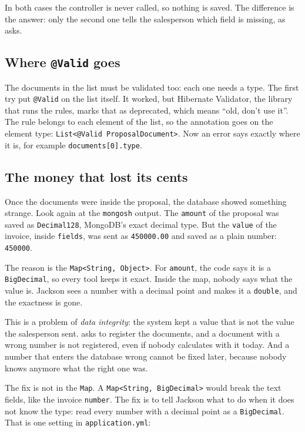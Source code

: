 In both cases the controller is never called, so nothing is saved. The
difference is the answer: only the second one tells the salesperson which
field is missing, as  asks.

\subsection*{Where \texttt{@Valid} goes}

The documents in the list must be validated too: each one needs a type. The
first try put \texttt{@Valid} on the list itself. It worked, but Hibernate
Validator, the library that runs the rules, marks that as deprecated, which
means ``old, don't use it''. The rule belongs to each element of the list, so
the annotation goes on the element type: \texttt{List<@Valid
ProposalDocument>}. Now an error says exactly where it is, for example
\texttt{documents[0].type}.

\subsection*{The money that lost its cents}

Once the documents were inside the proposal, the database showed something
strange. Look again at the
\texttt{mongosh} output. The \texttt{amount} of the proposal was saved as
\texttt{Decimal128}, MongoDB's exact decimal type. But the \texttt{value} of
the invoice, inside \texttt{fields}, was sent as \texttt{450000.00} and saved
as a plain number: \texttt{450000}.

The reason is the \texttt{Map<String, Object>}. For \texttt{amount}, the code
says it is a \texttt{BigDecimal}, so every tool keeps it exact. Inside the
map, nobody says what the value is. Jackson sees a number with a decimal
point and makes it a \texttt{double}, and the exactness is gone.

This is a problem of \emph{data integrity}: the system kept a value that is
not the value the salesperson sent.  asks to register the
documents, and a document with a wrong number is not registered, even if
nobody calculates with it today. And a number that enters the database wrong
cannot be fixed later, because nobody knows anymore what the right one was.

The fix is not in the \texttt{Map}. A \texttt{Map<String, BigDecimal>} would
break the text fields, like the invoice \texttt{number}. The fix is to tell
Jackson what to do when it does not know the type: read every number with a
decimal point as a \texttt{BigDecimal}. That is one setting in
\texttt{application.yml}:

